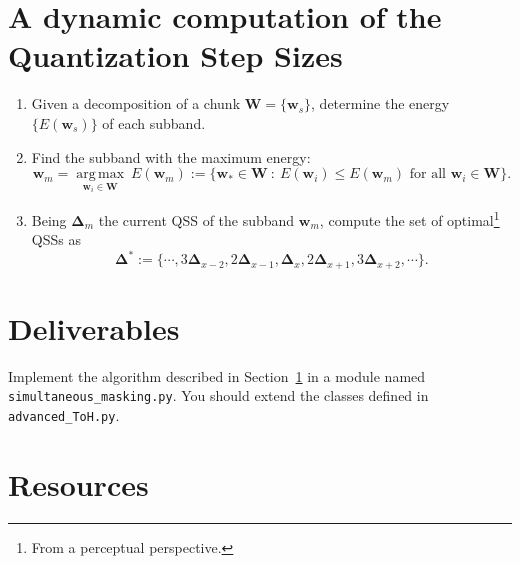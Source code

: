 \section{A dynamic computation of the Quantization Step Sizes}
\label{sec:algo}
\begin{enumerate}
\item Given a decomposition of a chunk ${\mathbf W}=\{{\mathbf w}_s\}$, determine
  the energy $\{E({\mathbf w}_s)\}$ of each subband.
\item Find the subband with the maximum energy:
  \begin{equation}
    {\mathbf w}_m = \underset{{\mathbf w}_i \in {\mathbf W}}{\operatorname{arg\,max}}~E({\mathbf w}_m) := \{{\mathbf w}_* \in {\mathbf W} ~:~ E({\mathbf w}_i) \leq E({\mathbf w}_m) \text{ for all } {\mathbf w}_i \in {\mathbf W} \}.
  \end{equation}
\item Being ${\mathbf \Delta}_m$ the current QSS of the subband
  ${\mathbf w}_m$, compute the set of optimal\footnote{From a
    perceptual perspective.} QSSs as
  \begin{equation}
    {\mathbf \Delta}^* := \{\cdots,3{\mathbf \Delta}_{x-2},2{\mathbf \Delta}_{x-1},{\mathbf \Delta}_x,2{\mathbf \Delta}_{x+1},3{\mathbf \Delta}_{x+2}, \cdots\}.
  \end{equation}
\end{enumerate}

\section{Deliverables}

Implement the algorithm described in Section~\ref{sec:algo} in a
module named \verb|simultaneous_masking.py|. You should extend the
classes defined in \verb|advanced_ToH.py|.

\section{Resources}



